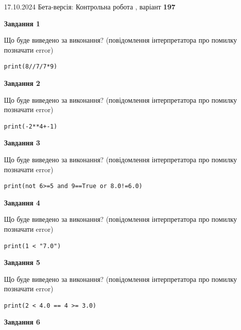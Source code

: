 \documentclass[12pt, ukrainian]{article}
\begin{document}
{\Large{17.10.2024 Бета-версія: Контрольна робота , варіант  \No \textbf { 197 }\par}}
{
\begin {large}
{\begin {center}\textbf{Завдання 1}\end {center}}

Що буде виведено за виконання? (повідомлення інтерпретатора про помилку позначати error)\par
\begin{verbatim}
print(8//7/7*9)
\end{verbatim}

{\begin {center}\textbf{Завдання 2}\end {center}}

Що буде виведено за виконання? (повідомлення інтерпретатора про помилку позначати error)\par
\begin{verbatim}
print(-2**4+-1)
\end{verbatim}

{\begin {center}\textbf{Завдання 3}\end {center}}

Що буде виведено за виконання? (повідомлення інтерпретатора про помилку позначати error)\par
\begin{verbatim}
print(not 6>=5 and 9==True or 8.0!=6.0)
\end{verbatim}

{\begin {center}\textbf{Завдання 4}\end {center}}

Що буде виведено за виконання? (повідомлення інтерпретатора про помилку позначати error)\par
\begin{verbatim}
print(1 < "7.0")
\end{verbatim}

{\begin {center}\textbf{Завдання 5}\end {center}}

Що буде виведено за виконання? (повідомлення інтерпретатора про помилку позначати error)\par
\begin{verbatim}
print(2 < 4.0 == 4 >= 3.0)
\end{verbatim}

{\begin {center}\textbf{Завдання 6}\end {center}}


\end{large}}
\end{document}

